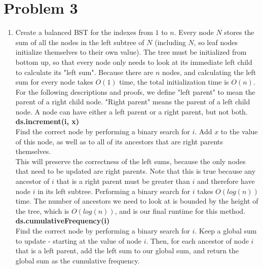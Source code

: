\documentclass{article}
\theoremstyle{casestyle}
\begin{document}
\section *{Problem 3}
\begin{enumerate}[i]
\item 
  Create a balanced BST for the indexes from $1$ to $n$. Every node $N$ stores the sum of all the nodes in the left subtree of $N$ (including $N$, so leaf nodes initialize themselves to their own value).  The tree must be initialized from bottom up, so that every node only needs to look at its immediate left child to calculate its "left sum". Because there are $n$ nodes, and calculating the left sum for every node takes $O(1)$ time, the total initialization time is $O(n)$.\\

  For the following descriptions and proofs, we define "left parent" to mean the parent of a right child node. "Right parent" means the parent of a left child node. A node can have either a left parent or a right parent, but not both.\\

  \textbf{ds.increment(i, x)}\\
  Find the correct node by performing a binary search for $i$. Add $x$ to the value of this node, as well as to all of its ancestors that are right parents themselves. \\

  This will preserve the correctness of the left sums, because the only nodes that need to be updated are right parents. Note that this is true because any ancestor of $i$ that is a right parent must be greater than $i$ and therefore have node $i$ in its left subtree. Performing a binary search for $i$ takes $O(log(n))$ time. The number of ancestors we need to look at is bounded by the height of the tree, which is $O(log(n))$, and is our final runtime for this method.\\

  \textbf{ds.cumulativeFrequency(i)}\\
  Find the correct node by performing a binary search for $i$. Keep a global sum to update - starting at the value of node $i$. Then, for each ancestor of node $i$ that is a left parent, add the left sum to our global sum, and return the global sum as the cumulative frequency.\\


\end{enumerate}
\end{document}

